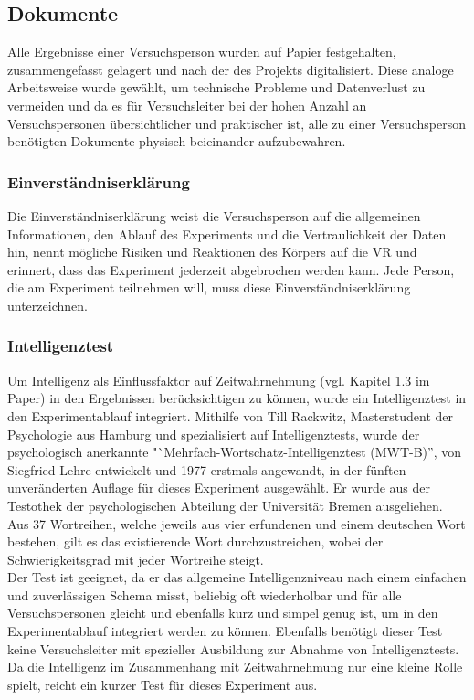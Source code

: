 \documentclass{Bericht}
\begin{document}
\subsection{Dokumente}
Alle Ergebnisse einer Versuchsperson wurden auf Papier festgehalten, zusammengefasst gelagert und nach der des Projekts digitalisiert. Diese analoge Arbeitsweise wurde gewählt, um technische Probleme und Datenverlust zu vermeiden und da es für Versuchsleiter bei der hohen Anzahl an Versuchspersonen übersichtlicher und praktischer ist, alle zu einer Versuchsperson benötigten Dokumente physisch beieinander aufzubewahren.

\subsubsection{Einverständniserklärung}

Die Einverständniserklärung weist die Versuchsperson auf die allgemeinen Informationen, den Ablauf des Experiments und die Vertraulichkeit der Daten hin, nennt mögliche Risiken und Reaktionen des Körpers auf die VR und erinnert, dass das Experiment jederzeit abgebrochen werden kann. Jede Person, die am Experiment teilnehmen will, muss diese Einverständniserklärung unterzeichnen.

\subsubsection{Intelligenztest}
	
Um Intelligenz als Einflussfaktor auf Zeitwahrnehmung (vgl. Kapitel 1.3 im Paper) in den Ergebnissen berücksichtigen zu können, wurde ein Intelligenztest in den Experimentablauf integriert.
Mithilfe von Till Rackwitz, Masterstudent der Psychologie aus Hamburg und spezialisiert auf Intelligenztests, wurde der psychologisch anerkannte "`Mehrfach-Wortschatz-Intelligenztest (MWT-B)'', von Siegfried Lehre entwickelt und 1977 erstmals angewandt, in der fünften unveränderten Auflage für dieses Experiment ausgewählt. Er wurde aus der Testothek der psychologischen Abteilung der Universität Bremen ausgeliehen.\\
Aus 37 Wortreihen, welche jeweils aus vier erfundenen und einem deutschen Wort bestehen, gilt es das existierende Wort durchzustreichen, wobei der Schwierigkeitsgrad mit jeder Wortreihe steigt.\\
Der Test ist geeignet, da er das allgemeine Intelligenzniveau nach einem einfachen und zuverlässigen Schema misst, beliebig oft wiederholbar und für alle Versuchspersonen gleicht und ebenfalls kurz und simpel genug ist, um in den Experimentablauf integriert werden zu können. Ebenfalls benötigt dieser Test keine Versuchsleiter mit spezieller Ausbildung zur Abnahme von Intelligenztests. 
Da die Intelligenz im Zusammenhang mit Zeitwahrnehmung nur eine kleine Rolle spielt, reicht ein kurzer Test für dieses Experiment aus. 
\end{document}
